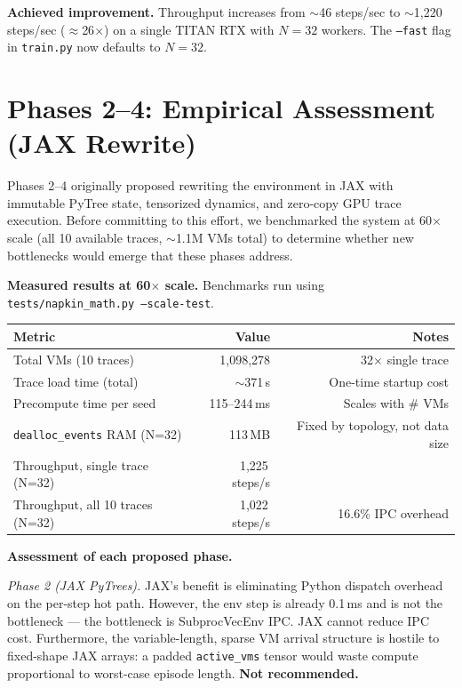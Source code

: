 \documentclass[11pt]{article}
\begin{document}
\textbf{Achieved improvement.}
Throughput increases from $\sim$46 steps/sec to $\sim$1,220 steps/sec
($\approx$26$\times$) on a single TITAN RTX with $N=32$ workers.
The \texttt{--fast} flag in \texttt{train.py} now defaults to $N=32$.

\section{Phases 2--4: Empirical Assessment (JAX Rewrite)}

Phases 2--4 originally proposed rewriting the environment in JAX with
immutable PyTree state, tensorized dynamics, and zero-copy GPU trace
execution.  Before committing to this effort, we benchmarked the system
at 60$\times$ scale (all 10 available traces, $\sim$1.1M VMs total) to
determine whether new bottlenecks would emerge that these phases address.

\textbf{Measured results at 60$\times$ scale.}
Benchmarks run using \texttt{tests/napkin\_math.py --scale-test}.

\begin{center}
\begin{tabular}{lrr}
\hline
\textbf{Metric} & \textbf{Value} & \textbf{Notes} \\
\hline
Total VMs (10 traces)            & 1,098,278    & 32$\times$ single trace \\
Trace load time (total)          & $\sim$371\,s & One-time startup cost \\
Precompute time per seed         & 115--244\,ms & Scales with \# VMs \\
\texttt{dealloc\_events} RAM (N=32)& 113\,MB    & Fixed by topology, not data size \\
Throughput, single trace (N=32)  & 1,225\,steps/s & \\
Throughput, all 10 traces (N=32) & 1,022\,steps/s & 16.6\% IPC overhead \\
\hline
\end{tabular}
\end{center}

\textbf{Assessment of each proposed phase.}

\textit{Phase 2 (JAX PyTrees).}
JAX's benefit is eliminating Python dispatch overhead on the per-step hot
path.  However, the env step is already 0.1\,ms and is not the bottleneck
--- the bottleneck is SubprocVecEnv IPC.  JAX cannot reduce IPC cost.
Furthermore, the variable-length, sparse VM arrival structure is hostile
to fixed-shape JAX arrays: a padded \texttt{active\_vms} tensor would
waste compute proportional to worst-case episode length.
\textbf{Not recommended.}
\end{document}
